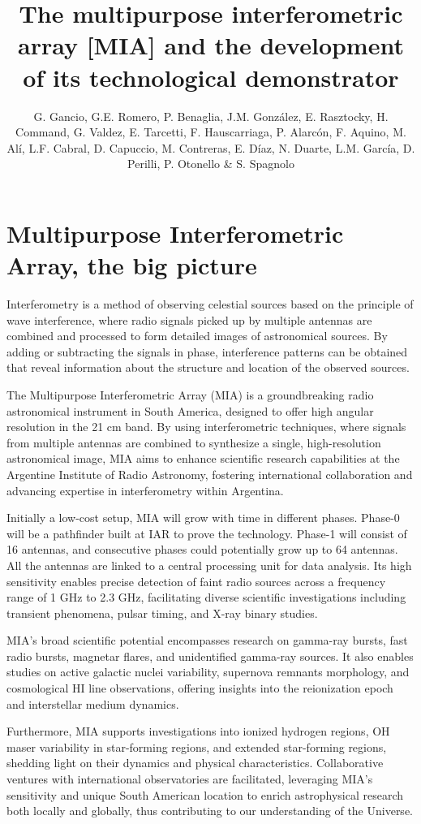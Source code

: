 \documentclass[baaa]{baaa}
\title{The multipurpose interferometric array [MIA] and the development of its technological demonstrator}
\author{
G. Gancio\inst{1},
G.E. Romero\inst{1},
P. Benaglia\inst{1},
J.M. González\inst{1},
E. Rasztocky\inst{1},
H. Command\inst{1},
G. Valdez\inst{1},
E. Tarcetti\inst{1},
F. Hauscarriaga\inst{1},
P. Alarcón\inst{1},
F. Aquino\inst{1},
M. Alí\inst{1},
L.F. Cabral\inst{1},
D. Capuccio\inst{1},
M. Contreras\inst{1},
E. Díaz\inst{1},
N. Duarte\inst{1},
L.M. García\inst{1},
D. Perilli\inst{1},
P. Otonello\inst{1} \&
S. Spagnolo\inst{1}
}
\institute{
Instituto Argentino de Radioastronomía, CONICET--CICPBA--UNLP, Argentina}
\begin{document}
\maketitle
\section{Multipurpose Interferometric Array, the big picture}
\label{sec:intro}
Interferometry is a method of observing celestial sources based on the principle of wave interference, where radio signals picked up by multiple antennas are combined and processed to form detailed images of astronomical sources. By adding or subtracting the signals in phase, interference patterns can be obtained that reveal information about the structure and location of the observed sources.

The Multipurpose Interferometric Array (MIA) is a groundbreaking radio astronomical instrument in South America, designed to offer high angular resolution in the 21 cm band. By using interferometric techniques, where signals from multiple antennas are combined to synthesize a single, high-resolution astronomical image, MIA aims to enhance scientific research capabilities at the Argentine Institute of Radio Astronomy, fostering international collaboration and advancing expertise in interferometry within Argentina.

Initially a low-cost setup, MIA will grow with time in different phases. Phase-0 will be a pathfinder built at IAR to prove the technology. Phase-1 will consist of 16 antennas, and consecutive phases could potentially grow up to 64 antennas. All the antennas are linked to a central processing unit for data analysis. Its high sensitivity enables precise detection of faint radio sources across a frequency range of 1 GHz to 2.3 GHz, facilitating diverse scientific investigations including transient phenomena, pulsar timing, and X-ray binary studies.

MIA's broad scientific potential encompasses research on gamma-ray bursts, fast radio bursts, magnetar flares, and unidentified gamma-ray sources. It also enables studies on active galactic nuclei variability, supernova remnants morphology, and cosmological HI line observations, offering insights into the reionization epoch and interstellar medium dynamics.

Furthermore, MIA supports investigations into ionized hydrogen regions, OH maser variability in star-forming regions, and extended star-forming regions, shedding light on their dynamics and physical characteristics. Collaborative ventures with international observatories are facilitated, leveraging MIA's sensitivity and unique South American location to enrich astrophysical research both locally and globally, thus contributing to our understanding of the Universe.
\end{document}
